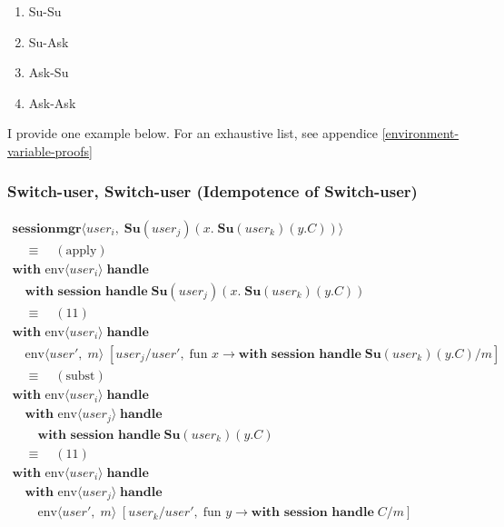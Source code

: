 \documentclass[logo,bsc,singlespacing,parskip]{infthesis}
\begin{document}
\begin{enumerate}
    \item Su-Su
    \item Su-Ask
    \item Ask-Su
    \item Ask-Ask
\end{enumerate}
    

I provide one example below. For an exhaustive list, see appendice \ref{environment-variable-proofs}
\subsubsection*{Switch-user, Switch-user (Idempotence of Switch-user)}


\[
\begin{array}{l}
\textbf{sessionmgr} \langle \mathit{user}_i,\; \textbf{Su}(\mathit{user}_j)(x.\;\textbf{Su}(\mathit{user}_k)(y.C)) \rangle \\[5pt]

\quad\equiv\quad (\text{apply}) \\[5pt]
\textbf{with }\text{}\text{env} \langle \mathit{user}_i \rangle\; \textbf{handle} \\
\quad\textbf{with session handle}\; \textbf{Su}(\mathit{user}_j)(x.\;\textbf{Su}(\mathit{user}_k)(y.C)) \\[5pt]

\quad\equiv\quad (11) \\[5pt]
\textbf{with }\text{env} \langle \mathit{user}_i \rangle\; \textbf{handle} \\
\quad\textbf{}\text{env} \langle \mathit{user}',\; m \rangle\; [\mathit{user}_j/\mathit{user}',\; \text{fun } x \rightarrow \textbf{with session handle}\; \textbf{Su}(\mathit{user}_k)(y.C)/m] \\[5pt]

\quad\equiv\quad (\text{subst}) \\[5pt]
\textbf{with }\text{env} \langle \mathit{user}_i \rangle\; \textbf{handle} \\
\quad\textbf{with }\text{env} \langle \mathit{user}_j \rangle\; \textbf{handle} \\
\qquad\textbf{with session handle}\; \textbf{Su}(\mathit{user}_k)(y.C) \\[5pt]

\quad\equiv\quad (11) \\[5pt]
\textbf{with }\text{env} \langle \mathit{user}_i \rangle\; \textbf{handle} \\
\quad\textbf{with }\text{env} \langle \mathit{user}_j \rangle\; \textbf{handle} \\
\qquad\textbf{}\text{env} \langle \mathit{user}',\; m \rangle\; [\mathit{user}_k/\mathit{user}',\; \text{fun } y \rightarrow \textbf{with session handle}\; C/m] \\[5pt]


\end{array}\]
\end{document}
